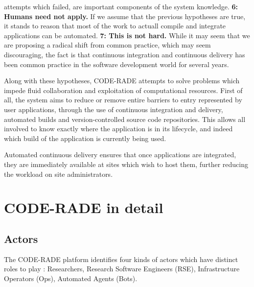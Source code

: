 \documentclass[a4paper]{jpconf}
\begin{document}
            attempts which failed, are important components of the system knowledge. %
        {\bf 6: Humans need not apply.}
        If we assume that the previous hypotheses are true, it stands to reason that most of the
            work to actuall compile and integrate applications can be automated. %
        {\bf 7: This is not hard.}
        While it may seem that we are proposing a radical shift from common practice, which may seem
            discouraging, the fact is that continuous integration\cite{ContinuousIntegration} and
            continuous delivery\cite{ContinuousDelivery} has been common practice in the software
            development world for several years.

    Along with these hypotheses, CODE-RADE attempts  to solve problems which impede fluid
    collaboration and exploitation of computational resources. First of all, the system aims to
    reduce or remove entire barriers to entry represented by user applications, through the use of
    continuous integration and delivery, automated builds and version-controlled source code
    repositories. This allows all involved to know exactly where the application is in its
    lifecycle, and indeed which build of the application is currently being used.

    Automated continuous delivery ensures that once applications are integrated, they are
    immediately available at sites which wish to host them, further reducing the workload on site
    administrators.

	\section{CODE-RADE in detail}

	\subsection{Actors}

	The CODE-RADE platform identifies four kinds of actors which have distinct roles to play :
 Researchers, Research Software Engineers (RSE), Infrastructure Operators (Ops), Automated Agents (Bots).
\end{document}
